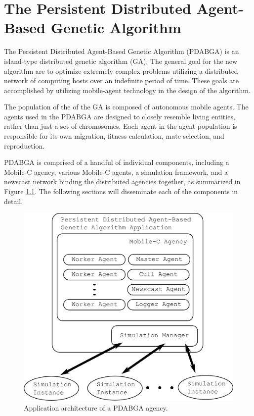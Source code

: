 \chapter{The Persistent Distributed Agent-Based Genetic Algorithm}
  The Persistent Distributed Agent-Based Genetic Algorithm (PDABGA) 
    is an island-type distributed genetic algorithm (GA). 
  The general goal for the new algorithm are to optimize extremely
    complex problems utilizing a distributed network of computing hosts
    over an indefinite period of time.
  These goals are accomplished by utilizing mobile-agent technology in the 
    design of the algorithm.

  The population of the of the GA is composed of autonomous mobile agents.
  The agents used in the PDABGA are designed to closely resemble living
    entities, rather than just a set of chromosomes.
  Each agent in the agent population is responsible for its own migration, fitness
    calculation, mate selection, and reproduction. 

  PDABGA is
    comprised of a handful of individual components, including a Mobile-C
    agency, various Mobile-C agents, a simulation framework, and a
    newscast network binding the distributed agencies together, as summarized
    in Figure \ref{fig:pdabga_architecture}.
  The following sections will disseminate each of the components in detail.

  \begin{figure}[!ht]
  \begin{center}
     \includegraphics[width=5in]{figures/application_architecture}
  \end{center}
  \caption{\label{fig:pdabga_architecture}Application architecture of a PDABGA agency.}
  \end{figure}


